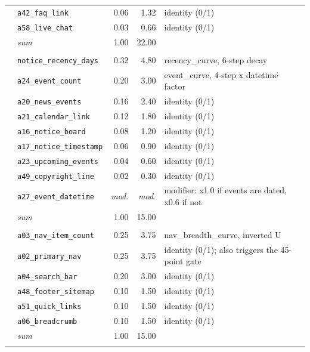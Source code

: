 \begin{longtable}{@{}llrrp{4.6cm}@{}}
& \texttt{a42\_faq\_link} & 0.06 & 1.32 & \small identity (0/1) \\
& \texttt{a58\_live\_chat} & 0.03 & 0.66 & \small identity (0/1) \\
& \emph{sum} & 1.00 & 22.00 & \\\addlinespace[3pt]
\multicolumn{5}{@{}l}{\cellcolor{softgrey}\textbf{$D3$ --- Currency and activity} \quad $w_{3} = 15$ points}\\
& \texttt{notice\_recency\_days} & 0.32 & 4.80 & \small recency\_curve, 6-step decay \\
& \texttt{a24\_event\_count} & 0.20 & 3.00 & \small event\_curve, 4-step x datetime factor \\
& \texttt{a20\_news\_events} & 0.16 & 2.40 & \small identity (0/1) \\
& \texttt{a21\_calendar\_link} & 0.12 & 1.80 & \small identity (0/1) \\
& \texttt{a16\_notice\_board} & 0.08 & 1.20 & \small identity (0/1) \\
& \texttt{a17\_notice\_timestamp} & 0.06 & 0.90 & \small identity (0/1) \\
& \texttt{a23\_upcoming\_events} & 0.04 & 0.60 & \small identity (0/1) \\
& \texttt{a49\_copyright\_line} & 0.02 & 0.30 & \small identity (0/1) \\
& \texttt{a27\_event\_datetime} & \emph{mod.} & \emph{mod.} & \small modifier: x1.0 if events are dated, x0.6 if not \\
& \emph{sum} & 1.00 & 15.00 & \\\addlinespace[3pt]
\multicolumn{5}{@{}l}{\cellcolor{softgrey}\textbf{$D4$ --- Navigation and findability} \quad $w_{4} = 15$ points}\\
& \texttt{a03\_nav\_item\_count} & 0.25 & 3.75 & \small nav\_breadth\_curve, inverted U \\
& \texttt{a02\_primary\_nav} & 0.25 & 3.75 & \small identity (0/1); also triggers the 45-point gate \\
& \texttt{a04\_search\_bar} & 0.20 & 3.00 & \small identity (0/1) \\
& \texttt{a48\_footer\_sitemap} & 0.10 & 1.50 & \small identity (0/1) \\
& \texttt{a51\_quick\_links} & 0.10 & 1.50 & \small identity (0/1) \\
& \texttt{a06\_breadcrumb} & 0.10 & 1.50 & \small identity (0/1) \\
& \emph{sum} & 1.00 & 15.00 & \\\addlinespace[3pt]

\end{longtable}

